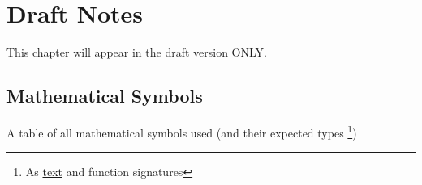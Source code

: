 
\chapter*{Draft Notes}

This chapter will appear in the draft version ONLY.

\section{Mathematical Symbols}

A table of all mathematical symbols used (and their expected types
\footnote{As \href{https://en.wikipedia.org/wiki/List_of_mathematical_symbols_by_subject}{text} 
and function signatures})

